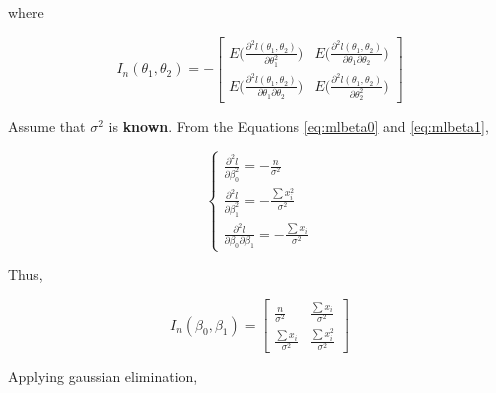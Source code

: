 \documentclass[]{book}
\theoremstyle{definition}
\theoremstyle{definition}
\theoremstyle{definition}
\theoremstyle{remark}
\begin{document}
where

\[
I_n(\theta_1, \theta_2) = - \begin{bmatrix}
  E\bigg( \frac{\partial^2 l(\theta_1, \theta_2)}{\partial \theta_1^2} \bigg) & E\bigg( \frac{\partial^2 l(\theta_1, \theta_2)}{\partial \theta_1 \partial \theta_2} \bigg) \\
  E\bigg( \frac{\partial^2 l(\theta_1, \theta_2)}{\partial \theta_1 \partial \theta_2} \bigg) & E\bigg( \frac{\partial^2 l(\theta_1, \theta_2)}{\partial \theta_2^2} \bigg)
\end{bmatrix}
\]

Assume that \(\sigma^2\) is \textbf{known}. From the Equations \eqref{eq:mlbeta0} and \eqref{eq:mlbeta1},

\[
\begin{cases}
  \frac{\partial^2 l}{\partial \beta_0^2} = - \frac{n}{\sigma^2} \\
  \frac{\partial^2 l}{\partial \beta_1^2} = - \frac{\sum x_i^2}{\sigma^2} \\
  \frac{\partial^2 l}{\partial \beta_0 \partial \beta_1} = - \frac{\sum x_i}{\sigma^2}
\end{cases}
\]

Thus,

\[
I_n(\beta_0, \beta_1) = \begin{bmatrix}
  \frac{n}{\sigma^2} & \frac{\sum x_i}{\sigma^2} \\
  \frac{\sum x_i}{\sigma^2} & \frac{\sum x_i^2}{\sigma^2}
\end{bmatrix}
\]

Applying gaussian elimination,
\end{document}
